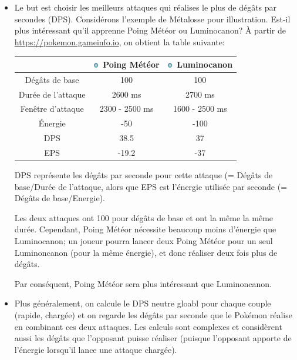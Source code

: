 \documentclass[12pt]{beamer}
\newcommand{\steelsimp}{\includegraphics[height=0.2cm]{../../../images/type/simplified/steel.png}}
\begin{document}
\begin{frame}
\begin{block}{}
\begin{footnotesize}
\begin{itemize}
  \item Le but est choisir les meilleurs attaques qui réalises le plus de dégâts par secondes (DPS). Considérons l'exemple de Métalosse pour illustration. Est-il plus intéressant qu'il apprenne Poing Météor ou Luminocanon? \`A partir de \url{https://pokemon.gameinfo.io}, on obtient la table suivante:
  \begin{center}
\begin{tabular}{ccc}
& \steelsimp~Poing Météor & \steelsimp~Luminocanon \\ \hline
Dégâts de base & 100 &100 \\
Durée de l'attaque & 2600 ms & 2700 ms \\
Fenêtre d'attaque &2300 - 2500 ms & 1600 - 2500 ms \\
\'Energie & -50 & -100  \\ \hline
DPS	& 38.5 & 37 \\
EPS & -19.2 &-37 \\
\end{tabular}
\end{center}

DPS représente les dégâts par seconde pour cette attaque (= Dégâts de base/Durée de l'attaque, alors que EPS est l'énergie utilisée par seconde (=  Dégâts de base/Energie).

Les deux attaques ont 100 pour dégâts de base et ont la même la même durée. Cependant, Poing Météor nécessite beaucoup moins d'énergie que Luminocanon; un joueur pourra lancer deux Poing Météor pour un seul Luminoncanon (pour la même énergie), et donc réaliser deux fois plus de dégâts. 

Par conséquent, Poing Météor sera plus intéressant que Luminoncanon.
\item Plus généralement, on calcule le DPS neutre gloabl pour chaque couple (rapide, chargée) et on regarde les dégâts par seconde que le Pok\'emon réalise en combinant ces deux attaques. Les calculs sont complexes et considèrent aussi les dégâts que l'opposant puisse réaliser (puisque l'opposant apporte de l'énergie lorsqu'il lance une attaque chargée).

\begin{center}
   \href{https://pokemongo.gamepress.gg/tdo-how-calculate-pokemon-ability-outdated}{} \quad \quad 
   \href{https://pokemongo.gamepress.gg/comprehensive-dps-spreadsheet}{}
\end{center}


\end{itemize}
\end{footnotesize}
\end{block}
\end{frame}
\end{document}
